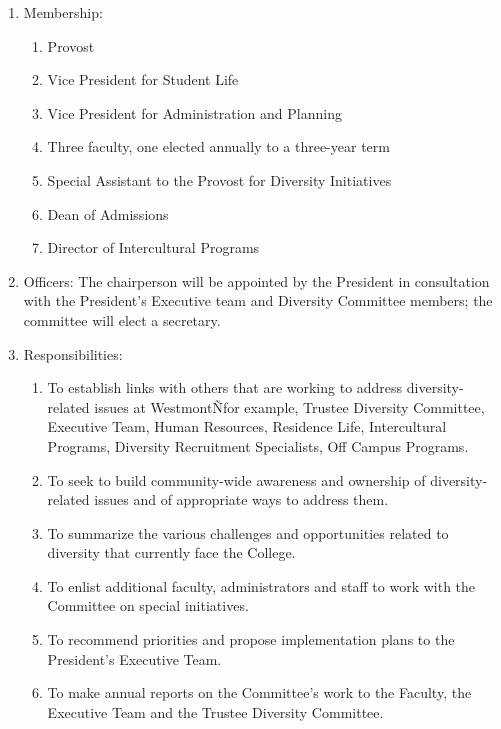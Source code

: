 \documentclass[letterpaper, 11pt]{article}
\begin{document}
					\begin{enumerate}[label=\alph*)]
						\item{Membership:
							\begin{enumerate}[label=\arabic*)]
								\item{Provost}
								\item{Vice President for Student Life}
								\item{Vice President for Administration and Planning}
								\item{Three faculty, one elected annually to a three-year term}
								\item{Special Assistant to the Provost for Diversity Initiatives}
								\item{Dean of Admissions}
								\item{Director of Intercultural Programs}
							\end{enumerate}
						}
						\item{Officers:
							The chairperson will be appointed by the President in consultation with the President's Executive team and Diversity Committee members; the committee will elect a secretary.}
						\item{Responsibilities:
							\begin{enumerate}[label=\arabic*)]
								\item{To establish links with others that are working to address diversity-related issues at WestmontÑfor example, Trustee Diversity Committee, Executive Team, Human Resources, Residence Life, Intercultural Programs, Diversity Recruitment Specialists, Off Campus Programs.}
								\item{To seek to build community-wide awareness and ownership of diversity-related issues and of appropriate ways to address them.}
								\item{To summarize the various challenges and opportunities related to diversity that currently face the College.}
								\item{To enlist additional faculty, administrators and staff to work with the Committee on special initiatives.}
								\item{To recommend priorities and propose implementation plans to the President's Executive Team.}
								\item{To make annual reports on the Committee's work to the Faculty, the Executive Team and the Trustee Diversity Committee.}
							\end{enumerate}
						}
					\end{enumerate}
\end{document}
